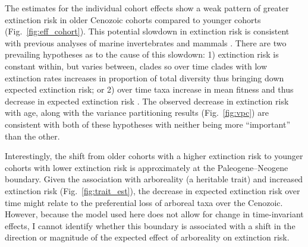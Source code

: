 \documentclass{pnastwo}
\begin{document}
\begin{article}
The estimates for the individual cohort effects show a weak pattern of greater extinction risk in older Cenozoic cohorts compared to younger cohorts (Fig.~\ref{fig:eff_cohort}). This potential slowdown in extinction risk is consistent with previous analyses of marine invertebrates \cite{Raup1982a,Foote2003} and mammals \cite{Alroy2010c,Alroy2000g}. There are two prevailing hypotheses as to the cause of this slowdown: 1) extinction risk is constant within, but varies between, clades so over time clades with low extinction rates increases in proportion of total diversity thus bringing down expected extinction risk; or 2) over time taxa increase in mean fitness and thus decrease in expected extinction risk \cite{Raup1982a}. The observed decrease in extinction risk with age, along with the variance partitioning results (Fig.~\ref{fig:vpc}) are consistent with both of these hypotheses with neither being more ``important'' than the other. 

Interestingly, the shift from older cohorts with a higher extinction risk to younger cohorts with lower extinction risk is approximately at the Paleogene--Neogene boundary. Given the association with arboreality (a heritable trait) and increased extinction risk (Fig.~\ref{fig:trait_est}), the decrease in expected extinction risk over time might relate to the preferential loss of arboreal taxa over the Cenozoic. However, because the model used here does not allow for change in time-invariant effects, I cannot identify whether this boundary is associated with a shift in the direction or magnitude of the expected effect of arboreality on extinction risk.


\end{article}
\end{document}
